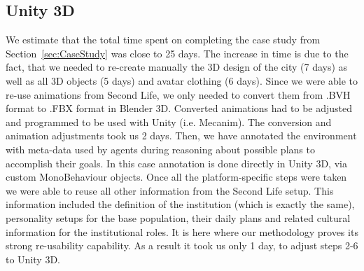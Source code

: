 


\subsection{Unity 3D}

We estimate that the total time spent on completing the case study from Section~\ref{sec:CaseStudy} was close to 25 days. The increase in time is due to the fact, that we needed to re-create manually the 3D design of the city (7 days) as well as all 3D objects (5 days) and avatar clothing (6 days). Since we were able to re-use animations from Second Life, we only needed to convert them from .BVH format to .FBX format in Blender 3D. Converted animations had to be adjusted and programmed to be used with Unity (i.e. Mecanim). The conversion and animation adjustments took us 2 days. Then, we have annotated the environment with meta-data used by agents during reasoning about possible plans to accomplish their goals. In this case annotation is done directly in Unity 3D, via custom MonoBehaviour objects. Once all the platform-specific steps were taken we were able to reuse all other information from the Second Life setup. This information included the definition of the institution (which is exactly the same), personality setups for the base population, their daily plans and related cultural information for the institutional roles. It is here where our methodology proves its strong re-usability capability. As a result it took us only 1 day, to adjust steps 2-6 to Unity 3D.

